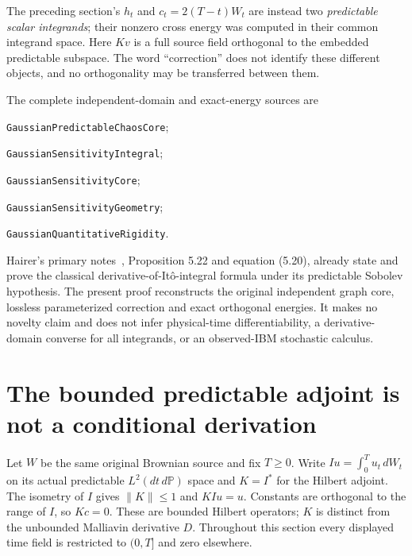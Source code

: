 \documentclass[11pt]{article}
\begin{document}
The preceding section's $h_t$ and $c_t=2(T-t)W_t$ are instead two
\emph{predictable scalar integrands}; their nonzero cross energy
was computed in their common integrand space. Here $Kv$ is a full
source field orthogonal to the embedded predictable subspace.
The word ``correction'' does not identify these different objects,
and no orthogonality may be transferred between them.

The complete independent-domain and exact-energy sources are
\par\noindent\texttt{GaussianPredictableChaosCore};
\par\noindent\texttt{GaussianSensitivityIntegral};
\par\noindent\texttt{GaussianSensitivityCore};
\par\noindent\texttt{GaussianSensitivityGeometry};
\par\noindent\texttt{GaussianQuantitativeRigidity}.
\par\noindent Hairer's primary notes~\cite{HairerSensitivity},
Proposition 5.22 and equation (5.20), already state and prove the
classical derivative-of-It\^o-integral formula under its predictable
Sobolev hypothesis. The present proof reconstructs the original
independent graph core, lossless parameterized correction and exact
orthogonal energies. It makes no novelty claim and does not infer
physical-time differentiability, a derivative-domain converse for
all integrands, or an observed-IBM stochastic calculus.


\section{The bounded predictable adjoint is not a conditional derivation}
Let $W$ be the same original Brownian source and fix $T\geq0$.
Write $Iu=\int_0^T u_t\,dW_t$ on its actual predictable
$L^2(dt\,d\mathbb P)$ space and $K=I^*$ for the Hilbert adjoint.
The isometry of $I$ gives $\|K\|\leq1$ and $KIu=u$.
Constants are orthogonal to the range of $I$, so $Kc=0$.
These are bounded Hilbert operators; $K$ is distinct from the
unbounded Malliavin derivative $D$. Throughout this section every
displayed time field is restricted to $(0,T]$ and zero elsewhere.
\end{document}
